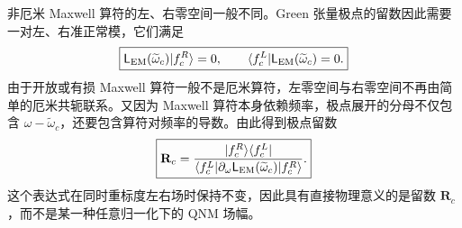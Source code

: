 非厄米 Maxwell 算符的左、右零空间一般不同。Green 张量极点的留数因此需要一对左、右准正常模，它们满足
\begin{equation}
\boxed{
\mathsf L_{\rm EM}(\widetilde\omega_c)|f_c^R\rangle=0,
\qquad
\langle f_c^L|\mathsf L_{\rm EM}(\widetilde\omega_c)=0.}
\label{eq:qnm_left_right_null_vectors}
\end{equation}
由于开放或有损 Maxwell 算符一般不是厄米算符，左零空间与右零空间不再由简单的厄米共轭联系。又因为 Maxwell 算符本身依赖频率，极点展开的分母不仅包含 $\omega-\widetilde\omega_c$，还要包含算符对频率的导数。由此得到极点留数
\begin{equation}
\boxed{
\mathbf R_c
=\frac{|f_c^R\rangle\langle f_c^L|}
{\langle f_c^L|\partial_\omega\mathsf L_{\rm EM}(\widetilde\omega_c)|f_c^R\rangle}.}
\label{eq:qnm_green_residue_operator_formula}
\end{equation}
这个表达式在同时重标度左右场时保持不变，因此具有直接物理意义的是留数 $\mathbf R_c$，而不是某一种任意归一化下的 QNM 场幅。

